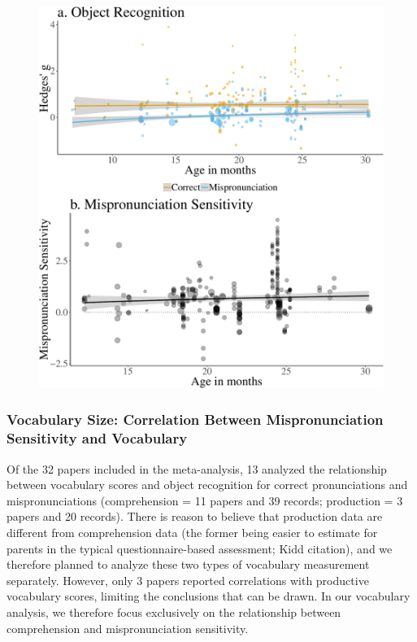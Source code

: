 \documentclass[man]{apa6}
\theoremstyle{definition}
\theoremstyle{definition}
\theoremstyle{definition}
\theoremstyle{remark}
\begin{document}
\begin{figure}
\centering
\includegraphics{Paper_Analyses_files/figure-latex/PlotMPEffect-1.pdf}
\caption{}
\end{figure}

\subsubsection{Vocabulary Size: Correlation Between Mispronunciation
Sensitivity and
Vocabulary}\label{vocabulary-size-correlation-between-mispronunciation-sensitivity-and-vocabulary}

Of the 32 papers included in the meta-analysis, 13 analyzed the
relationship between vocabulary scores and object recognition for
correct pronunciations and mispronunciations (comprehension = 11 papers
and 39 records; production = 3 papers and 20 records). There is reason
to believe that production data are different from comprehension data
(the former being easier to estimate for parents in the typical
questionnaire-based assessment; Kidd citation), and we therefore planned
to analyze these two types of vocabulary measurement separately.
However, only 3 papers reported correlations with productive vocabulary
scores, limiting the conclusions that can be drawn. In our vocabulary
analysis, we therefore focus exclusively on the relationship between
comprehension and mispronunciation sensitivity.
\end{document}
